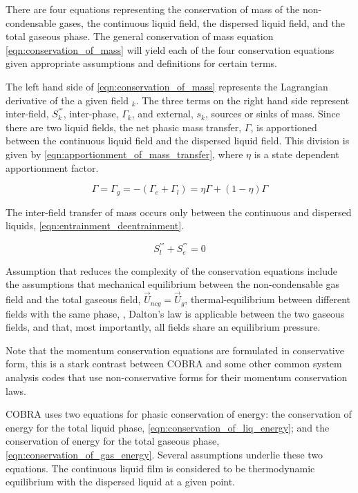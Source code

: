 There are four equations representing the conservation of mass of the non-condensable gases, the continuous liquid field, the dispersed liquid field, and the total gaseous phase.
The general conservation of mass equation \eqref{eqn:conservation_of_mass} will yield each of the four conservation equations given appropriate assumptions and definitions for certain terms.

The left hand side of \eqref{eqn:conservation_of_mass} represents the Lagrangian derivative of the a given field $_k$.
The three terms on the right hand side represent inter-field, $S^{'''}_k$, inter-phase, $\Gamma_k$,  and external, $s_k$, sources or sinks of mass.
Since there are two liquid fields, the net phasic mass transfer, $\Gamma$, is apportioned between the continuous liquid field and the dispersed liquid field.
This division is given by \eqref{eqn:apportionment_of_mass_transfer}, where $\eta$ is a state dependent apportionment factor.

\begin{equation}
\label{eqn:apportionment_of_mass_transfer}
\Gamma = \Gamma_g = -( \Gamma_e + \Gamma_l ) =  \eta \Gamma + (1 - \eta)\Gamma
\end{equation}

The inter-field transfer of mass occurs only between the continuous and dispersed liquids, \eqref{eqn:entrainment_deentrainment}.

\begin{equation}
\label{eqn:entrainment_deentrainment}
S^{'''}_l + S^{'''}_e = 0
\end{equation}

Assumption that reduces the complexity of the conservation equations include the assumptions that mechanical equilibrium between the non-condensable gas field and the total gaseous field, $\vec{U}_{ncg} = \vec{U}_g$, thermal-equilibrium between different fields with the same phase, $ $, Dalton's law is applicable between the two gaseous fields, and that, most importantly, all fields share an equilibrium pressure.

Note that the momentum conservation equations are formulated in conservative form, this is a stark contrast between COBRA and some other common system analysis codes \cite{TRACE, RELAP} that use non-conservative forms for their momentum conservation laws.

COBRA uses two equations for phasic conservation of energy: the conservation of energy for the total liquid phase, \eqref{eqn:conservation_of_liq_energy}; and the conservation of energy for the total gaseous phase, \eqref{eqn:conservation_of_gas_energy}.
Several assumptions underlie these two equations.
The continuous liquid film is considered to be thermodynamic equilibrium with the dispersed liquid at a given point.

